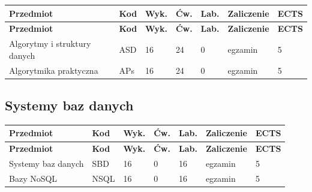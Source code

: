 \documentclass[12pt,a4paper]{article}
\newcommand{\thdrule}{\noalign{\global\setlength{\extrarowheight}{0pt}}}
\newcommand{\thdend}{\noalign{\global\setlength{\extrarowheight}{4pt}}}
\begin{document}
{\scriptsize
\begin{longtable}{m{5.5cm}m{0.8cm}m{1cm}m{1cm}m{1cm}m{1.7cm}m{0.7cm}}
\thdrule\toprule
\rowcolor{pjatkRed}
{\color{white}\footnotesize\textbf{\vphantom{Ag}Przedmiot}} & {\color{white}\footnotesize\textbf{\vphantom{Ag}Kod}} & {\color{white}\footnotesize\textbf{\vphantom{Ag}Wyk.}} & {\color{white}\footnotesize\textbf{\vphantom{Ag}Ćw.}} & {\color{white}\footnotesize\textbf{\vphantom{Ag}Lab.}} & {\color{white}\footnotesize\textbf{\vphantom{Ag}Zaliczenie}} & {\color{white}\footnotesize\textbf{\vphantom{Ag}ECTS}} \\
\midrule\thdend
\endfirsthead
\thdrule\toprule
\rowcolor{pjatkRed}
{\color{white}\footnotesize\textbf{\vphantom{Ag}Przedmiot}} & {\color{white}\footnotesize\textbf{\vphantom{Ag}Kod}} & {\color{white}\footnotesize\textbf{\vphantom{Ag}Wyk.}} & {\color{white}\footnotesize\textbf{\vphantom{Ag}Ćw.}} & {\color{white}\footnotesize\textbf{\vphantom{Ag}Lab.}} & {\color{white}\footnotesize\textbf{\vphantom{Ag}Zaliczenie}} & {\color{white}\footnotesize\textbf{\vphantom{Ag}ECTS}} \\
\midrule\thdend
\endhead
\rowcolor{tableRowLight} Algorytmy i struktury danych & ASD & 16 & 24 & 0 & {\scriptsize egzamin} & 5 \\
\rowcolor{tableRowAlt} Algorytmika praktyczna & APs & 16 & 24 & 0 & {\scriptsize egzamin} & 5 \\
\bottomrule
\end{longtable}}

\subsection*{Systemy baz danych}

{\scriptsize
\begin{longtable}{m{5.5cm}m{0.8cm}m{1cm}m{1cm}m{1cm}m{1.7cm}m{0.7cm}}
\thdrule\toprule
\rowcolor{pjatkRed}
{\color{white}\footnotesize\textbf{\vphantom{Ag}Przedmiot}} & {\color{white}\footnotesize\textbf{\vphantom{Ag}Kod}} & {\color{white}\footnotesize\textbf{\vphantom{Ag}Wyk.}} & {\color{white}\footnotesize\textbf{\vphantom{Ag}Ćw.}} & {\color{white}\footnotesize\textbf{\vphantom{Ag}Lab.}} & {\color{white}\footnotesize\textbf{\vphantom{Ag}Zaliczenie}} & {\color{white}\footnotesize\textbf{\vphantom{Ag}ECTS}} \\
\midrule\thdend
\endfirsthead
\thdrule\toprule
\rowcolor{pjatkRed}
{\color{white}\footnotesize\textbf{\vphantom{Ag}Przedmiot}} & {\color{white}\footnotesize\textbf{\vphantom{Ag}Kod}} & {\color{white}\footnotesize\textbf{\vphantom{Ag}Wyk.}} & {\color{white}\footnotesize\textbf{\vphantom{Ag}Ćw.}} & {\color{white}\footnotesize\textbf{\vphantom{Ag}Lab.}} & {\color{white}\footnotesize\textbf{\vphantom{Ag}Zaliczenie}} & {\color{white}\footnotesize\textbf{\vphantom{Ag}ECTS}} \\
\midrule\thdend
\endhead
\rowcolor{tableRowLight} Systemy baz danych & SBD & 16 & 0 & 16 & {\scriptsize egzamin} & 5 \\
\rowcolor{tableRowAlt} Bazy NoSQL & NSQL & 16 & 0 & 16 & {\scriptsize egzamin} & 5 \\
\bottomrule
\end{longtable}}
\end{document}
